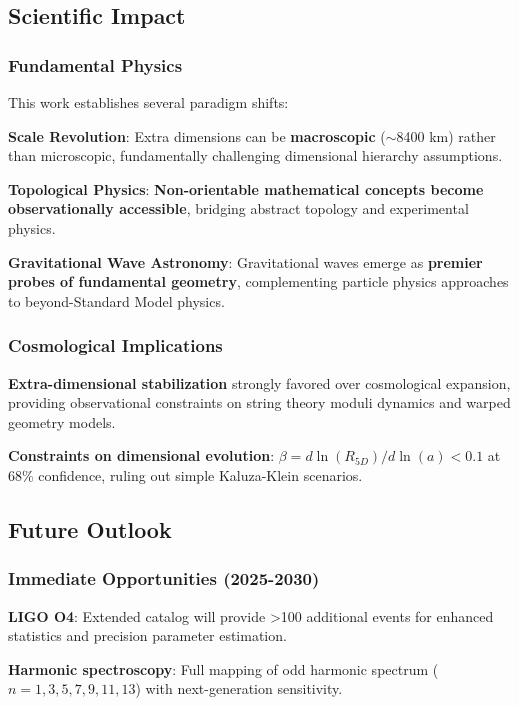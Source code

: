 \documentclass[11pt,a4paper]{article}
\begin{document}
\subsection{Scientific Impact}

\subsubsection{Fundamental Physics}

This work establishes several paradigm shifts:

\textbf{Scale Revolution}: Extra dimensions can be \textbf{macroscopic} ($\sim$8400 km) rather than microscopic, fundamentally challenging dimensional hierarchy assumptions.

\textbf{Topological Physics}: \textbf{Non-orientable mathematical concepts become observationally accessible}, bridging abstract topology and experimental physics.

\textbf{Gravitational Wave Astronomy}: Gravitational waves emerge as \textbf{premier probes of fundamental geometry}, complementing particle physics approaches to beyond-Standard Model physics.

\subsubsection{Cosmological Implications}

\textbf{Extra-dimensional stabilization} strongly favored over cosmological expansion, providing observational constraints on string theory moduli dynamics and warped geometry models.

\textbf{Constraints on dimensional evolution}: $\beta = d \ln(R_{5D})/d \ln(a) < 0.1$ at 68\% confidence, ruling out simple Kaluza-Klein scenarios.

\subsection{Future Outlook}

\subsubsection{Immediate Opportunities (2025-2030)}

\textbf{LIGO O4}: Extended catalog will provide >100 additional events for enhanced statistics and precision parameter estimation.

\textbf{Harmonic spectroscopy}: Full mapping of odd harmonic spectrum ($n=1,3,5,7,9,11,13$) with next-generation sensitivity.
\end{document}
